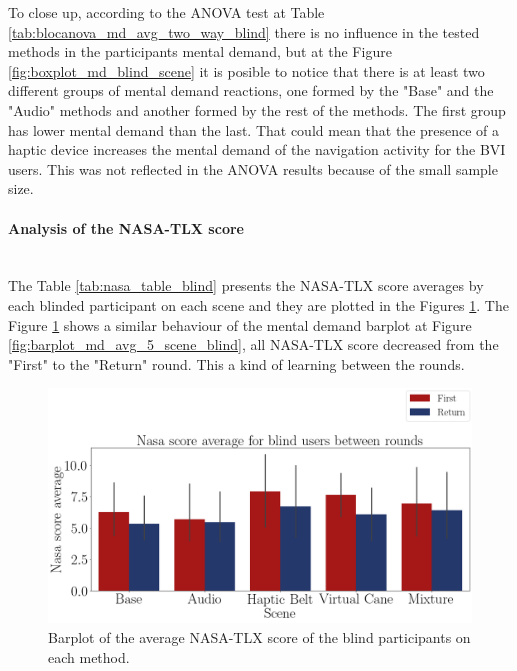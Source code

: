 
%

To close up, according to the ANOVA test at Table \ref{tab:blocanova_md_avg_two_way_blind} there is no influence in the tested methods in the participants mental demand, but at the Figure \ref{fig:boxplot_md_blind_scene} it is posible to notice that there is at least two different groups of mental demand reactions, one formed by the "Base" and the "Audio" methods and another formed by the rest of the methods. The first group has lower mental demand than the last. That could mean that the presence of a haptic device increases the mental demand of the navigation activity for the BVI users. This was not reflected in the ANOVA results because of the small sample size.

\FloatBarrier



\paragraph{Analysis of the NASA-TLX score}\mbox{}\\

The Table \ref{tab:nasa_table_blind} presents the NASA-TLX score averages by each blinded participant on each scene and they are plotted in the Figures \ref{fig:barplot_nasa_avg_5_scene_blind}. The Figure \ref{fig:barplot_nasa_avg_5_scene_blind} shows a similar behaviour of the mental demand barplot at Figure \ref{fig:barplot_md_avg_5_scene_blind}, all NASA-TLX score decreased from the "First" to the "Return" round. This a kind of learning between the rounds.



\begin{figure}[!htb]
    \centering
    \includegraphics[width = 0.8\linewidth]{Resultados/Nasa/Figuras/png/barplot_nasa_avg_5_scene_blind.png}
    \caption{Barplot of the average NASA-TLX score of the blind participants on each method.}
    \label{fig:barplot_nasa_avg_5_scene_blind}
\end{figure}

